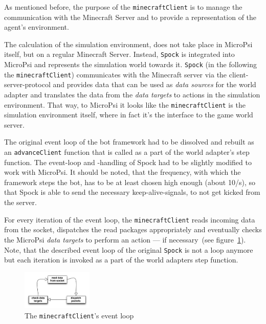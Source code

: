 As mentioned before, the purpose of the \texttt{minecraftClient} is to manage the communication with the Minecraft Server and to provide a representation of the agent's environment.

The calculation of the simulation environment, does not take place in MicroPsi itself, but on a regular Minecraft Server. Instead, \texttt{Spock} is integrated into MicroPsi and represents the simulation world towards it. \texttt{Spock} (in the following the \texttt{minecraftClient}) communicates with the Minecraft server via the client-server-protocol and provides data that can be used as \emph{data sources} for the world adapter and translates the data from the \emph{data targets} to actions in the simulation environment. That way, to MicroPsi it looks like the \texttt{minecraftClient} is the simulation environment itself, where in fact it's the interface to the game world server.

The original event loop of the bot framework had to be dissolved and rebuilt as an \texttt{advanceClient} function that is called as a part of the world adapter's step function. The event-loop and -handling of Spock had to be slightly modified to work with MicroPsi. It should be noted, that the frequency, with which the framework steps the bot, has to be at least chosen high enough (about 10/s), so that Spock is able to send the necessary keep-alive-signals, to not get kicked from the server.

For every iteration of the event loop, the \texttt{minecraftClient} reads incoming data from the socket, dispatches the read packages appropriately and eventually checks the MicroPsi \emph{data targets} to perform an action --- if necessary~(see figure~\ref{spock_loop}). Note, that the described event loop of the original \texttt{Spock} is not a loop anymore but each iteration is invoked as a part of the world adapters step function.


\begin{figure}
  \begin{center}
    \includegraphics[width=0.3\textwidth]{graphics/spock_eventloop}
  \end{center}
  \caption{The \texttt{minecraftClient}'s event loop}
  \label{spock_loop}
\end{figure}


